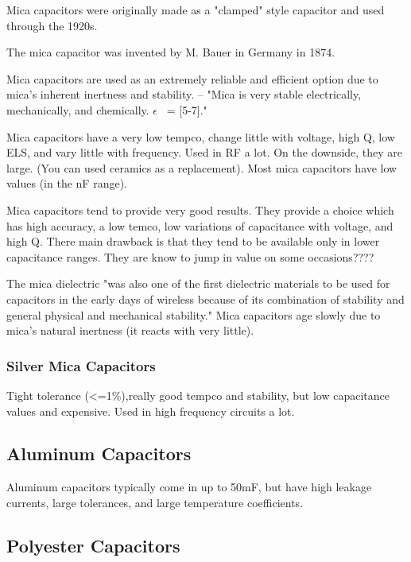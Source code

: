 Mica capacitors were originally made as a "clamped" style capacitor and used through the 1920s\cite{wiki_mica}. 

The mica capacitor was invented by M. Bauer in Germany in 1874. 

Mica capacitors are used as an extremely reliable and efficient option due to mica's inherent inertness and stability. \cite{tedds_mica}    
--
"Mica is very stable electrically, mechanically, and chemically. $\epsilon$ ~= [5-7].\cite{uiowa_mica}"

Mica capacitors have a very low tempco, change little with voltage, high Q, low ELS, and vary little with frequency. Used in RF a lot. On the downside, they are large. (You can used ceramics as a replacement). Most mica capacitors have low values (in the nF range).\cite{uiowa_mica}

\nocite{hh_cap_table}
\nocite{capGuide_mica}

Mica capacitors tend to provide very good results. They provide a choice which has high accuracy, a low temco, low variations of capacitance with voltage, and high Q. There main drawback is that they tend to be available only in lower capacitance ranges. They are know to jump in value on some occasions???? 
\cite{radio_mica}

The mica dielectric "was also one of the first dielectric materials to be used for capacitors in the early days of wireless because of its combination of stability and general physical and mechanical stability." Mica capacitors age slowly due to mica's natural inertness (it reacts with very little).\cite{radio_mica}

\subsubsection{Silver Mica Capacitors}

Tight tolerance (<=1\%),really good tempco and stability, but low capacitance values and expensive. Used in high frequency circuits a lot.\cite{learn_caps}

\subsection{Aluminum Capacitors}

Aluminum capacitors typically come in up to 50mF, but have high leakage currents, large tolerances, and large temperature coefficients. \cite{learn_caps}

\subsection{Polyester Capacitors}

